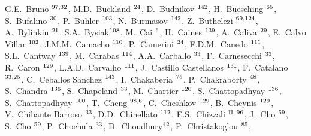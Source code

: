 \begin{flushleft}
G.E.~Bruno\,\,$^{\rm 97,32}$, 
M.D.~Buckland\,\,$^{\rm 24}$, 
D.~Budnikov\,\,$^{\rm 142}$, 
H.~Buesching\,\,$^{\rm 65}$, 
S.~Bufalino\,\,$^{\rm 30}$, 
P.~Buhler\,\,$^{\rm 103}$, 
N.~Burmasov\,\,$^{\rm 142}$, 
Z.~Buthelezi\,\,$^{\rm 69,124}$, 
A.~Bylinkin\,\,$^{\rm 21}$, 
S.A.~Bysiak$^{\rm 108}$, 
M.~Cai\,\,$^{\rm 6}$, 
H.~Caines\,\,$^{\rm 139}$, 
A.~Caliva\,\,$^{\rm 29}$, 
E.~Calvo Villar\,\,$^{\rm 102}$, 
J.M.M.~Camacho\,\,$^{\rm 110}$, 
P.~Camerini\,\,$^{\rm 24}$, 
F.D.M.~Canedo\,\,$^{\rm 111}$, 
S.L.~Cantway\,\,$^{\rm 139}$, 
M.~Carabas\,\,$^{\rm 114}$, 
A.A.~Carballo\,\,$^{\rm 33}$, 
F.~Carnesecchi\,\,$^{\rm 33}$, 
R.~Caron\,\,$^{\rm 129}$, 
L.A.D.~Carvalho\,\,$^{\rm 111}$, 
J.~Castillo Castellanos\,\,$^{\rm 131}$, 
F.~Catalano\,\,$^{\rm 33,25}$, 
C.~Ceballos Sanchez\,\,$^{\rm 143}$, 
I.~Chakaberia\,\,$^{\rm 75}$, 
P.~Chakraborty\,\,$^{\rm 48}$, 
S.~Chandra\,\,$^{\rm 136}$, 
S.~Chapeland\,\,$^{\rm 33}$, 
M.~Chartier\,\,$^{\rm 120}$, 
S.~Chattopadhyay\,\,$^{\rm 136}$, 
S.~Chattopadhyay\,\,$^{\rm 100}$, 
T.~Cheng\,\,$^{\rm 98,6}$, 
C.~Cheshkov\,\,$^{\rm 129}$, 
B.~Cheynis\,\,$^{\rm 129}$, 
V.~Chibante Barroso\,\,$^{\rm 33}$, 
D.D.~Chinellato\,\,$^{\rm 112}$, 
E.S.~Chizzali\,\,$^{\rm II,}$$^{\rm 96}$, 
J.~Cho\,\,$^{\rm 59}$, 
S.~Cho\,\,$^{\rm 59}$, 
P.~Chochula\,\,$^{\rm 33}$, 
D.~Choudhury$^{\rm 42}$, 
P.~Christakoglou\,\,$^{\rm 85}$, 
$$
\end{flushleft}
